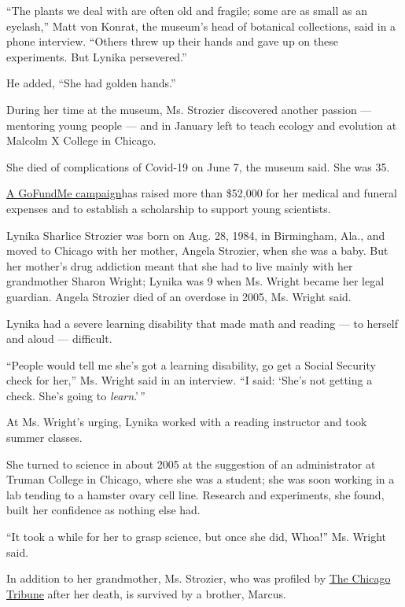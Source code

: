 ``The plants we deal with are often old and fragile; some are as small
as an eyelash,'' Matt von Konrat, the museum's head of botanical
collections, said in a phone interview. ``Others threw up their hands
and gave up on these experiments. But Lynika persevered.''

He added, ``She had golden hands.''

During her time at the museum, Ms. Strozier discovered another passion
--- mentoring young people --- and in January left to teach ecology and
evolution at Malcolm X College in Chicago.

She died of complications of Covid-19 on June 7, the museum said. She
was 35.

\href{https://www.gofundme.com/f/552b3q-lynika039s-funeral-expenses}{A
GoFundMe campaign}has raised more than \$52,000 for her medical and
funeral expenses and to establish a scholarship to support young
scientists.

Lynika Sharlice Strozier was born on Aug. 28, 1984, in Birmingham, Ala.,
and moved to Chicago with her mother, Angela Strozier, when she was a
baby. But her mother's drug addiction meant that she had to live mainly
with her grandmother Sharon Wright; Lynika was 9 when Ms. Wright became
her legal guardian. Angela Strozier died of an overdose in 2005, Ms.
Wright said.

Lynika had a severe learning disability that made math and reading ---
to herself and aloud --- difficult.

``People would tell me she's got a learning disability, go get a Social
Security check for her,'' Ms. Wright said in an interview. ``I said:
`She's not getting a check. She's going to \emph{learn}.'\emph{''}

At Ms. Wright's urging, Lynika worked with a reading instructor and took
summer classes.

She turned to science in about 2005 at the suggestion of an
administrator at Truman College in Chicago, where she was a student; she
was soon working in a lab tending to a hamster ovary cell line. Research
and experiments, she found, built her confidence as nothing else had.

``It took a while for her to grasp science, but once she did, Whoa!''
Ms. Wright said.

In addition to her grandmother, Ms. Strozier, who was profiled by
\href{https://www.chicagotribune.com/entertainment/ct-ent-lynika-strozier-field-museum-dies-covid19-20200618-sek3n2c3u5bwzjdqxalox4vvsy-story.html}{The
Chicago Tribune} after her death, is survived by a brother, Marcus.

